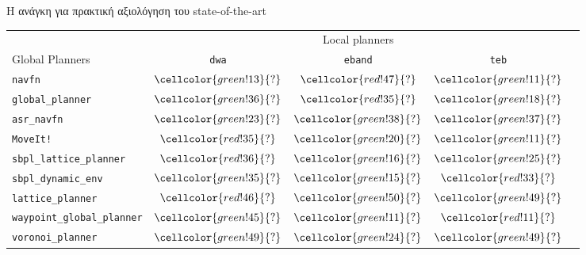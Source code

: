 \begin{frame}{Η ανάγκη για πρακτική αξιολόγηση του state-of-the-art}
{\footnotesize
\begin{table}[h]
\begin{tabular}{lcccc}
  & \multicolumn{3}{c}{Local planners} \\
  \cline{2-4}
  Global Planners                     & \texttt{dwa}                               & \texttt{eband}                             & \texttt{teb} \\ \toprule
  \texttt{navfn}                     & $\cellcolor{green!13}{?}$         & $\cellcolor{red!47}{?}$            & $\cellcolor{green!11}{?}$         \\
  \texttt{global\_planner}           & $\cellcolor{green!36}{?}$         & $\cellcolor{red!35}{?}$            & $\cellcolor{green!18}{?}$         \\
  \texttt{asr\_navfn}                & $\cellcolor{green!23}{?}$         & $\cellcolor{green!38}{?}$            & $\cellcolor{green!37}{?}$         \\
  \texttt{MoveIt!}                   & $\cellcolor{red!35}{?}$         & $\cellcolor{green!20}{?}$            & $\cellcolor{green!11}{?}$         \\
  \texttt{sbpl\_lattice\_planner}    & $\cellcolor{red!36}{?}$         & $\cellcolor{green!16}{?}$            & $\cellcolor{green!25}{?}$         \\
  \texttt{sbpl\_dynamic\_env}        & $\cellcolor{green!35}{?}$         & $\cellcolor{green!15}{?}$            & $\cellcolor{red!33}{?}$         \\
  \texttt{lattice\_planner}          & $\cellcolor{red!46}{?}$         & $\cellcolor{green!50}{?}$            & $\cellcolor{green!49}{?}$         \\
  \texttt{waypoint\_global\_planner} & $\cellcolor{green!45}{?}$         & $\cellcolor{green!11}{?}$            & $\cellcolor{red!11}{?}$         \\
  \texttt{voronoi\_planner}          & $\cellcolor{green!49}{?}$         & $\cellcolor{green!24}{?}$            & $\cellcolor{green!49}{?}$         \\ \bottomrule
\end{tabular}
\end{table}
}

\end{frame}

